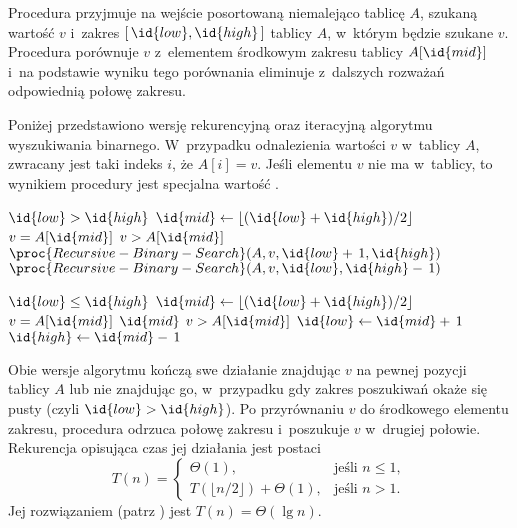 \exercise %
Procedura  przyjmuje na wejście posortowaną niemalejąco tablicę $A$, szukaną wartość $v$ i~zakres $[\,\id{low}, \id{high}\,]$ tablicy $A$, w~którym będzie szukane $v$. Procedura porównuje $v$ z~elementem środkowym zakresu tablicy $A[\id{mid}]$ i~na podstawie wyniku tego porównania eliminuje z~dalszych rozważań odpowiednią połowę zakresu.

Poniżej przedstawiono wersję rekurencyjną oraz iteracyjną algorytmu wyszukiwania binarnego. W~przypadku odnalezienia wartości $v$ w~tablicy $A$, zwracany jest taki indeks $i$, że $A[i]=v$. Jeśli elementu $v$ nie ma w~tablicy, to wynikiem procedury jest specjalna wartość .

\begin{codebox}
\li	\If $\id{low}>\id{high}$
\li		\Then
			\Return{}
		\End
\li	$\id{mid}\gets\lfloor(\id{low}+\id{high})/2\rfloor$
\li	\If $v=A[\id{mid}]$
\li		\Then
			\Return{}
		\End
\li	\If $v>A[\id{mid}]$
\li		\Then
			\Return $\proc{Recursive-Binary-Search}(A,v,\id{low}+\,1,\id{high})$
\li		\Else
			\Return $\proc{Recursive-Binary-Search}(A,v,\id{low},\id{high}-\,1)$
		\End
\end{codebox}

\begin{codebox}
\li	\While $\id{low}\le\id{high}$
\li		\Do
			$\id{mid}\gets\lfloor(\id{low}+\id{high})/2\rfloor$
\li			\If $v=A[\id{mid}]$
\li				\Then
					\Return $\id{mid}$
				\End
\li			\If $v>A[\id{mid}]$
\li				\Then
					$\id{low}\gets\id{mid}+\,1$
\li				\Else
					$\id{high}\gets\id{mid}-\,1$
				\End
		\End
\li	\Return{}
\end{codebox}

Obie wersje algorytmu  kończą swe działanie znajdując $v$ na pewnej pozycji tablicy $A$ lub nie znajdując go, w~przypadku gdy zakres poszukiwań okaże się pusty (czyli $\id{low}>\id{high}$). Po przyrównaniu $v$ do środkowego elementu zakresu, procedura odrzuca połowę zakresu i~poszukuje $v$ w~drugiej połowie. Rekurencja opisująca czas jej działania jest postaci
\[
	T(n) =
	\begin{cases}
		\Theta(1), & \text{jeśli $n\le1$}, \\
		T(\lfloor n/2\rfloor)+\Theta(1), & \text{jeśli $n>1$}.
	\end{cases}
\]
Jej rozwiązaniem (patrz ) jest $T(n)=\Theta(\lg n)$.

